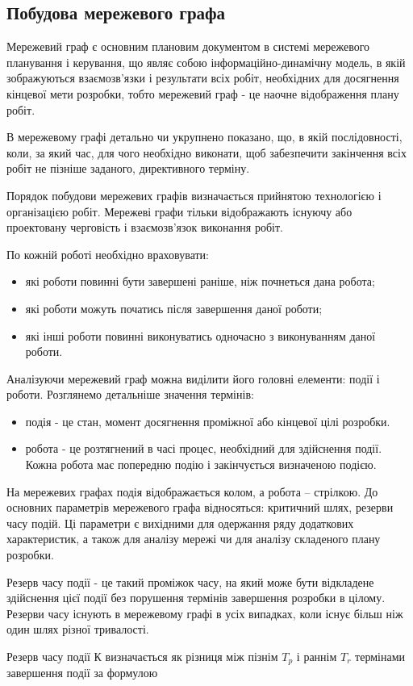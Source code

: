 \subsection{Побудова мережевого графа}
Мережевий граф є основним плановим документом в системі мережевого планування і керування, що являє собою інформаційно-динамічну модель, в якій зображуються взаємозв'язки і результати всіх робіт, необхідних для досягнення кінцевої мети розробки, тобто мережевий граф - це наочне відображення плану робіт.
\par В мережевому графі детально чи укрупнено показано, що, в якій послідовності, коли, за який час, для чого необхідно виконати, щоб забезпечити закінчення всіх робіт не пізніше заданого, директивного терміну.
\par Порядок побудови мережевих графів визначається прийнятою технологією і організацією робіт. Мережеві графи тільки відображають існуючу або проектовану черговість і взаємозв'язок виконання робіт.
\par По кожній роботі необхідно враховувати:
\begin{itemize}
	\item які роботи повинні бути завершені раніше, ніж почнеться дана робота;
	\item які роботи можуть початись після завершення даної роботи;
	\item які інші роботи повинні виконуватись одночасно з виконуванням даної роботи.
\end{itemize}
\par Аналізуючи мережевий граф можна виділити його головні елементи: події і роботи. Розглянемо детальніше значення термінів:
\begin{itemize}
	\item подія - це стан, момент досягнення проміжної або кінцевої цілі розробки.
	\item робота - це розтягнений в часі процес, необхідний для здійснення події. Кожна робота має попередню подію і закінчується визначеною подією.
\end{itemize}

\par На мережевих графах подія відображається колом, а робота -- стрілкою. До основних параметрів мережевого графа відносяться: критичний шлях, резерви часу подій. Ці параметри є вихідними для одержання ряду додаткових характеристик, а також для аналізу мережі чи для аналізу складеного плану розробки.
\par Резерв часу події - це такий проміжок часу, на який може бути відкладене здійснення цієї події без порушення термінів завершення розробки в цілому. Резерви часу існують в мережевому графі в усіх випадках, коли існує більш ніж один шлях різної тривалості.
\par Резерв часу події К визначається як різниця між пізнім $T_{p}$ і раннім $T_{r}$ термінами завершення події за формулою

